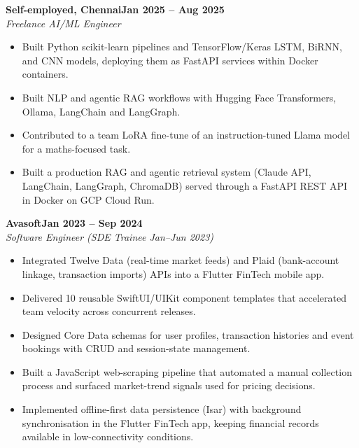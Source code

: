 \documentclass[a4paper,11pt]{article}
\newcommand{\entry}[4]{\needspace{4\baselineskip}\noindent\textbf{#1}\hfill\textbf{#2}\\ \textit{#3}\hfill\textit{#4}\par}
\begin{document}
\vspace{4pt}
\entry{Self-employed, Chennai}{Jan 2025 – Aug 2025}{Freelance AI/ML Engineer}{}
\begin{itemize}
  \item Built Python scikit-learn pipelines and TensorFlow/Keras LSTM, BiRNN, and CNN models, deploying them as FastAPI services within Docker containers.
  \item Built NLP and agentic RAG workflows with Hugging Face Transformers, Ollama, LangChain and LangGraph.
  \item Contributed to a team LoRA fine-tune of an instruction-tuned Llama model for a maths-focused task.
  \item Built a production RAG and agentic retrieval system (Claude API, LangChain, LangGraph, ChromaDB) served through a FastAPI REST API in Docker on GCP Cloud Run.
\end{itemize}
\vspace{4pt}
\entry{Avasoft}{Jan 2023 – Sep 2024}{Software Engineer (SDE Trainee Jan–Jun 2023)}{}
\begin{itemize}
  \item Integrated Twelve Data (real-time market feeds) and Plaid (bank-account linkage, transaction imports) APIs into a Flutter FinTech mobile app.
  \item Delivered 10 reusable SwiftUI/UIKit component templates that accelerated team velocity across concurrent releases.
  \item Designed Core Data schemas for user profiles, transaction histories and event bookings with CRUD and session-state management.
  \item Built a JavaScript web-scraping pipeline that automated a manual collection process and surfaced market-trend signals used for pricing decisions.
  \item Implemented offline-first data persistence (Isar) with background synchronisation in the Flutter FinTech app, keeping financial records available in low-connectivity conditions.
\end{itemize}

\end{document}
